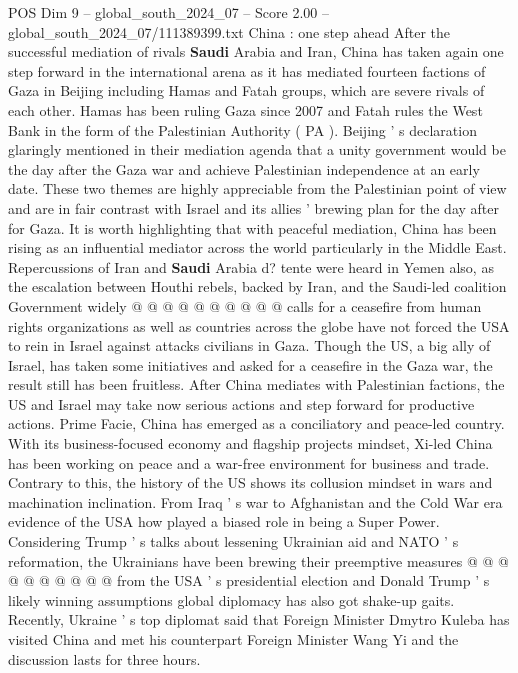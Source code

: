 \begin{textsample}{POS Dim 9 – global\_south\_2024\_07 – Score 2.00 – global\_south\_2024\_07/111389399.txt}  \label{ex:f9_pos_108}
China : one step ahead After the successful mediation of rivals \textbf{Saudi} Arabia and Iran, China has taken again one step forward in the international arena as it has mediated fourteen factions of Gaza in Beijing including Hamas and Fatah groups, which are severe rivals of each other.
Hamas has been ruling Gaza since 2007 and Fatah rules the West Bank in the form of the Palestinian Authority ( PA ).
Beijing ' s declaration glaringly mentioned in their mediation agenda that a unity government would be the day after the Gaza war and achieve Palestinian independence at an early date.
These two themes are highly appreciable from the Palestinian point of view and are in fair contrast with Israel and its allies ' brewing plan for the day after for Gaza.
It is worth highlighting that with peaceful mediation, China has been rising as an influential mediator across the world particularly in the Middle East.
Repercussions of Iran and \textbf{Saudi} Arabia d? tente were heard in Yemen also, as the escalation between Houthi rebels, backed by Iran, and the Saudi-led coalition Government widely @ @ @ @ @ @ @ @ @ @ calls for a ceasefire from human rights organizations as well as countries across the globe have not forced the USA to rein in Israel against attacks civilians in Gaza.
Though the US, a big ally of Israel, has taken some initiatives and asked for a ceasefire in the Gaza war, the result still has been fruitless.
After China mediates with Palestinian factions, the US and Israel may take now serious actions and step forward for productive actions.
Prime Facie, China has emerged as a conciliatory and peace-led country.
With its business-focused economy and flagship projects mindset, Xi-led China has been working on peace and a war-free environment for business and trade.
Contrary to this, the history of the US shows its collusion mindset in wars and machination inclination.
From Iraq ' s war to Afghanistan and the Cold War era evidence of the USA how played a biased role in being a Super Power.
Considering Trump ' s talks about lessening Ukrainian aid and NATO ' s reformation, the Ukrainians have been brewing their preemptive measures @ @ @ @ @ @ @ @ @ @ from the USA ' s presidential election and Donald Trump ' s likely winning assumptions global diplomacy has also got shake-up gaits.
Recently, Ukraine ' s top diplomat said that Foreign Minister Dmytro Kuleba has visited China and met his counterpart Foreign Minister Wang Yi and the discussion lasts for three hours.

\end{textsample}
